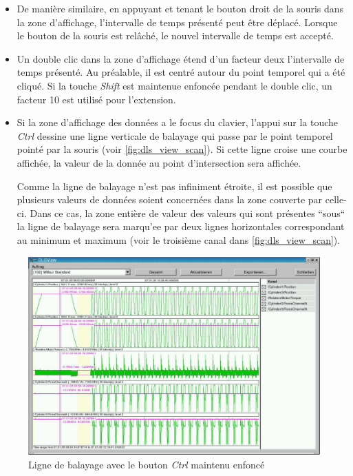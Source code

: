 \documentclass[a4paper,12pt,BCOR6mm,bibtotoc,idxtotoc]{scrbook}
\begin{document}
\begin{itemize}
\item De mani\`ere similaire, en appuyant et tenant le bouton droit de
  la souris dans la zone d'affichage, l'intervalle de temps pr\'esent\'e
  peut \^etre d\'eplac\'e. Lorsque le bouton de la souris est
  rel\^ach\'e, le nouvel intervalle de temps est accept\'e.

\item Un double clic dans la zone d'affichage \'etend d'un facteur
  deux l'intervalle de temps pr\'esent\'e. Au pr\'ealable, il est
  centr\'e autour du point temporel qui a \'et\'e cliqu\'e. Si la touche
  \textit{Shift} est maintenue enfonc\'ee pendant le double clic, un
  facteur 10 est utilis\'e pour l'extension.

\item Si la zone d'affichage des donn\'ees a le focus du clavier,
  l'appui sur la touche \textit{Ctrl} dessine une ligne verticale
  de balayage qui passe par le point temporel point\'e par la souris
  (voir \autoref{fig:dls_view_scan}).  Si cette ligne croise une
  courbe affich\'ee, la valeur de la donn\'ee au point d'intersection
  sera affich\'ee.

  Comme la ligne de balayage n'est pas infiniment \'etroite, il est
  possible que plusieurs valeurs de donn\'ees soient concern\'ees dans
  la zone couverte par celle-ci. Dans ce cas, la zone enti\`ere de
  valeur des valeurs qui sont pr\'esentes ``sous`` la ligne de
  balayage sera marqu'ee par deux lignes horizontales correspondant au
  minimum et maximum (voir le troisi\`eme canal dans
  \autoref{fig:dls_view_scan}).

\end{itemize}

\begin{figure}[tbh]
  \begin{center}
    \includegraphics[width=\textwidth]{bilder/view_scan}
  \end{center}
  \caption{Ligne de balayage avec le bouton \textit{Ctrl} maintenu enfonc\'e}
  \label{fig:dls_view_scan}
\end{figure}
\end{document}
